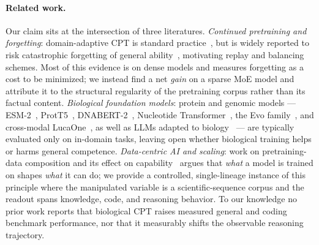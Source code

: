 \documentclass[11pt]{article}
\begin{document}
\paragraph{Related work.}
Our claim sits at the intersection of three literatures. \emph{Continued pretraining and
forgetting}: domain-adaptive CPT is standard practice~\citep{ibrahim2024cpt, jindal2024balance,
jiang2024instruction}, but is widely reported to risk catastrophic forgetting of general
ability~\citep{luo2023forgetting, huang2024sssr}, motivating replay and balancing schemes. Most
of this evidence is on dense models and measures forgetting as a cost to be minimized; we instead
find a net \emph{gain} on a sparse MoE model and attribute it to the structural regularity of the
pretraining corpus rather than its factual content. \emph{Biological foundation models}: protein
and genomic models --- ESM-2~\citep{lin2023evolutionary}, ProtT5~\citep{elnaggar2021prottrans},
DNABERT-2~\citep{zhou2023dnabert2}, Nucleotide Transformer~\citep{dallatorre2023nucleotide}, the
Evo family~\citep{nguyen2024evo, brixi2026evo2}, and cross-modal LucaOne~\citep{he2024lucaone}, as
well as LLMs adapted to biology~\citep{luo2022biogpt, wang2026biopaws, wang2024llamagene} --- are
typically evaluated only on in-domain tasks, leaving open whether biological training helps or
harms general competence. \emph{Data-centric AI and scaling}: work on pretraining-data
composition and its effect on capability~\citep{gadre2021pile, hoffmann2022chinchilla} argues that
\emph{what} a model is trained on shapes \emph{what} it can do; we provide a controlled,
single-lineage instance of this principle where the manipulated variable is a scientific-sequence
corpus and the readout spans knowledge, code, and reasoning behavior. To our knowledge no prior
work reports that biological CPT raises measured general and coding benchmark performance, nor
that it measurably shifts the observable reasoning trajectory.
\end{document}
